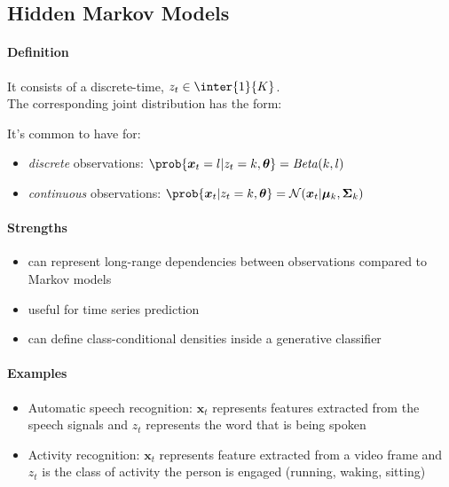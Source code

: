 \subsection{Hidden Markov Models}
\paragraph{Definition}
It consists of a discrete-time,  
$z_{t}\in\inter{1}{K}$.\\
The corresponding joint distribution has the form:
\begin{center}
\end{center}

It's common to have for:
\begin{itemize}
    \item \emph{discrete} observations: $\prob{\bm{x}_{t}=l|z_{t}=k,\bm{\theta}} = \text{\emph{Beta}}
        (k,l)$
    \item \emph{continuous} observations: $\prob{\bm{x}_{t}|z_{t}=k,\bm{\theta}} = \mathcal{N}(\bm{x}
        _{t}|\bm{\mu}_{k},\bm{\Sigma}_{k})$
\end{itemize}

\paragraph{Strengths}
\begin{itemize}
    \item can represent long-range dependencies between observations compared to Markov models
    \item useful for time series prediction
    \item can define class-conditional densities inside a generative classifier
\end{itemize}

\paragraph{Examples}
\begin{itemize}
    \item Automatic speech recognition: $\bm{x}_{t}$ represents features extracted from the speech 
        signals and $z_{t}$ represents the word that is being spoken
    \item Activity recognition: $\bm{x}_{t}$ represents feature extracted from a video frame and 
        $z_{t}$ is the class of activity the person is engaged (running, waking, sitting)
\end{itemize}

